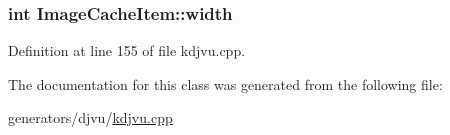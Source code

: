 \hypertarget{classImageCacheItem_a1481bdd684cf00f3f895302ad8b65720}{
\subsubsection[{width}]{\setlength{\rightskip}{0pt plus 5cm}int Image\+Cache\+Item\+::width}}\label{classImageCacheItem_a1481bdd684cf00f3f895302ad8b65720}


Definition at line 155 of file kdjvu.\+cpp.



The documentation for this class was generated from the following file\+:\begin{DoxyCompactItemize}
\item 
generators/djvu/\hyperlink{kdjvu_8cpp}{kdjvu.\+cpp}\end{DoxyCompactItemize}
